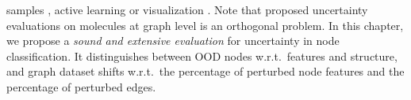 samples \citep{Zhao2020}, active learning \cite{Ng2018} or visualization \citep{Borovitskiy2020}. Note that proposed uncertainty evaluations on molecules at graph level \citep{Zhang2019, Ryu2019, Akita2018, uncertainty-nn-molecules, uncertainty-material-prediction} is an orthogonal problem. In this chapter, we propose a \emph{sound and extensive evaluation} for uncertainty in node classification. It distinguishes between OOD nodes w.r.t.\ features and structure, and graph dataset shifts w.r.t.\ the percentage of perturbed node features and the percentage of perturbed edges.

